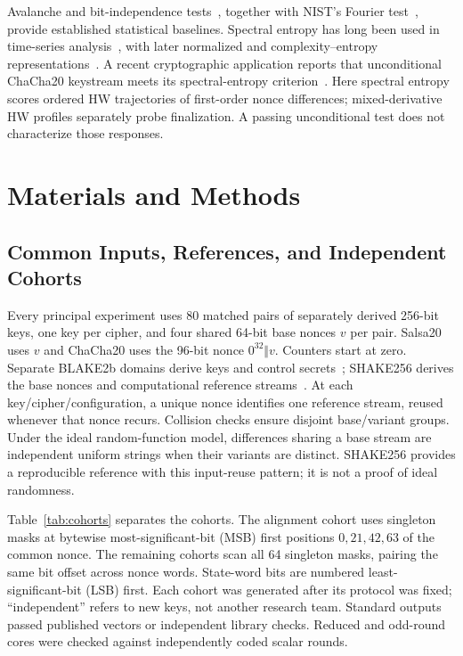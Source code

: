 \documentclass[electronics,article,submit,pdftex,oneauthor]{Definitions/mdpi}
\begin{document}
Avalanche and bit-independence tests~\citep{webster1986,hernandez2005,madarro2024}, together with NIST's Fourier test~\citep{nist2010}, provide established statistical baselines. Spectral entropy has long been used in time-series analysis~\citep{powell1979,inouye1991}, with later normalized and complexity--entropy representations~\citep{zaccarelli2013,dai2018,mao2018}. A recent cryptographic application reports that unconditional ChaCha20 keystream meets its spectral-entropy criterion~\citep{kasyanov2026}. Here spectral entropy scores ordered HW trajectories of first-order nonce differences; mixed-derivative HW profiles separately probe finalization. A passing unconditional test does not characterize those responses.


\section{Materials and Methods}
\subsection{Common Inputs, References, and Independent Cohorts}

Every principal experiment uses 80 matched pairs of separately derived 256-bit keys, one key per cipher, and four shared 64-bit base nonces $v$ per pair. Salsa20 uses $v$ and ChaCha20 uses the 96-bit nonce $0^{32}\Vert v$. Counters start at zero. Separate BLAKE2b domains derive keys and control secrets~\citep{saarinen2015}; SHAKE256 derives the base nonces and computational reference streams~\citep{nist2015sha3}. At each key/cipher/configuration, a unique nonce identifies one reference stream, reused whenever that nonce recurs. Collision checks ensure disjoint base/variant groups. Under the ideal random-function model, differences sharing a base stream are independent uniform strings when their variants are distinct. SHAKE256 provides a reproducible reference with this input-reuse pattern; it is not a proof of ideal randomness.

Table~\ref{tab:cohorts} separates the cohorts. The alignment cohort uses singleton masks at bytewise most-significant-bit (MSB) first positions $0,21,42,63$ of the common nonce. The remaining cohorts scan all 64 singleton masks, pairing the same bit offset across nonce words. State-word bits are numbered least-significant-bit (LSB) first. Each cohort was generated after its protocol was fixed; ``independent'' refers to new keys, not another research team. Standard outputs passed published vectors or independent library checks. Reduced and odd-round cores were checked against independently coded scalar rounds.
\end{document}
